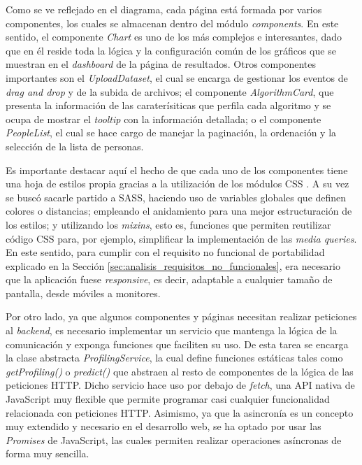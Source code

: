 \bigskip
Como se ve reflejado en el diagrama, cada página está formada por varios componentes, los cuales se almacenan dentro del módulo \textit{components}.
En este sentido, el componente \textit{Chart} es uno de los más complejos e interesantes, dado que en él reside toda la lógica y la configuración común
 de los gráficos que se muestran en el \textit{dashboard} de la página de resultados. Otros componentes importantes son el \textit{UploadDataset},
el cual se encarga de gestionar los eventos de \textit{drag and drop} y de la subida de archivos; el componente \textit{AlgorithmCard}, que
presenta la información de las caraterísiticas que perfila cada algoritmo y se ocupa de mostrar el \textit{tooltip} con la información detallada;
o el componente \textit{PeopleList}, el cual se hace cargo de manejar la paginación, la ordenación y la selección de la lista de personas.

\bigskip
Es importante
destacar aquí el hecho de que cada uno de los componentes tiene una hoja de estilos propia gracias a la utilización de los módulos CSS \cite{cssmodules}. A su vez
se buscó sacarle partido a SASS, haciendo uso de variables globales que definen colores o distancias; empleando el anidamiento para una mejor
estructuración de los estilos; y utilizando los \textit{mixins}, esto es, funciones que permiten reutilizar código CSS para, por ejemplo, simplificar la implementación de las \textit{media queries}. En este
sentido, para cumplir con el requisito no funcional de portabilidad explicado en la Sección \ref{sec:analisis_requisitos_no_funcionales}, 
era necesario que la aplicación fuese \textit{responsive}, es decir, adaptable a cualquier tamaño de pantalla, desde móviles a monitores.


\bigskip
Por otro lado, ya que algunos componentes y páginas necesitan realizar peticiones al \textit{backend}, es necesario implementar un servicio
que mantenga la lógica de la comunicación y exponga funciones que faciliten su uso. De esta tarea se encarga la clase abstracta \textit{ProfilingService},
la cual define funciones estáticas tales como \textit{getProfiling()} o \textit{predict()} que abstraen al resto de componentes de la lógica de las peticiones HTTP.
Dicho servicio hace uso por debajo de \textit{fetch}, una API nativa de JavaScript muy flexible que permite programar casi cualquier funcionalidad
relacionada con peticiones HTTP. Asimismo, ya que la asincronía es un concepto muy extendido y necesario en el desarrollo web, se ha optado
por usar las \textit{Promises} de JavaScript, las cuales permiten realizar operaciones asíncronas de forma muy sencilla.


